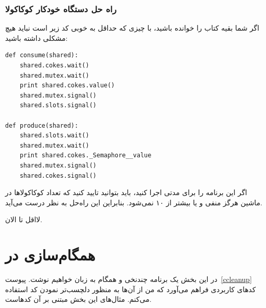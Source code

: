 \documentclass{book}
\newcommand{\clearemptydoublepage}{\newpage\cleardoublepage}
\begin{document}
\clearemptydoublepage
\subsection {راه حل دستگاه خودکار کوکاکولا}

    اگر شما بقیه کتاب را خوانده باشید، با چیزی که حداقل به خوبی کد زیر است نباید هیچ مشکلی داشته باشید:

\begin{latin}
\begin{lstlisting}
def consume(shared):
    shared.cokes.wait()
    shared.mutex.wait()
    print shared.cokes.value()
    shared.mutex.signal()
    shared.slots.signal()

def produce(shared):
    shared.slots.wait()
    shared.mutex.wait()
    print shared.cokes._Semaphore__value
    shared.mutex.signal()
    shared.cokes.signal()
\end{lstlisting}
\end{latin}


    اگر این برنامه را برای مدتی اجرا کنید، باید بتوانید تایید کنید که تعداد کوکاکولاها در ماشین هرگز منفی و یا بیشتر از ۱۰ نمی‌شود. 
    بنابراین این راه‌حل به نظر درست می‌آید. 

    لااقل تا الان. 

\chapter{همگام‌سازی در }
\label{csync}

    در این بخش یک برنامه چندنخی و همگام به زبان  خواهیم نوشت. پیوست~\ref{ccleanup} کدهای کاربردی فراهم می‌آورد که 
    من از آن‌ها به منظور دلچسب‌تر نمودن کد   استفاده می‌کنم. مثال‌های این بخش مبتنی بر آن کدهاست. 
    
\end{document}

